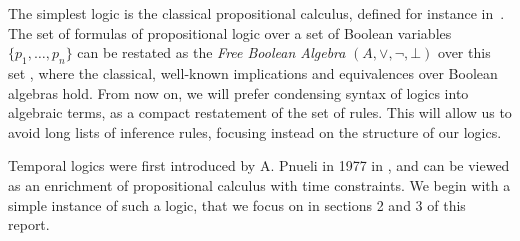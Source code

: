 \documentclass[11pt]{article}
\newcommand{\orr}{{\vee}}
\theoremstyle{definition}
\begin{document}
The simplest logic is the classical propositional calculus, defined for instance in~\cite[Section 3]{PropLog}. 
The set of formulas of propositional logic over a set of Boolean variables 
$\{p_1,\ldots,p_n\}$ can be restated as the \emph{Free Boolean Algebra} $(A,\orr,\neg,\bot)$
over this set \cite[Section 4.1]{GehvG22},
where the classical, well-known implications and equivalences over Boolean algebras hold. From now
on, we will prefer condensing syntax of logics into algebraic terms, as a compact restatement of the set of rules.
This will allow us to avoid long lists of inference rules, focusing instead on the
structure of our logics.

Temporal logics were first introduced by A. Pnueli in 1977 in \cite{Pnu77}, and can be
viewed as an enrichment of propositional calculus with time constraints. We begin with a simple
instance of such a logic, that we focus on in sections 2 and 3 of this report.
\end{document}

